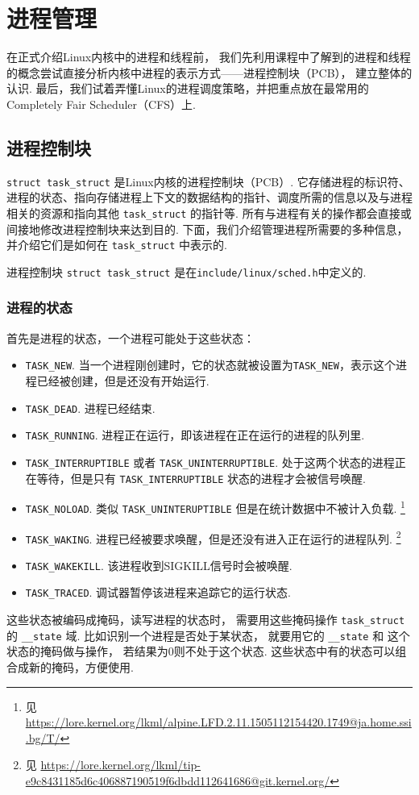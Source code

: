 \section{进程管理}
在正式介绍Linux内核中的进程和线程前，
我们先利用课程中了解到的进程和线程的概念尝试直接分析内核中进程的表示方式——进程控制块（PCB），
建立整体的认识.
最后，我们试着弄懂Linux的进程调度策略，并把重点放在最常用的
Completely Fair Scheduler（CFS）上.

\subsection{进程控制块}
\lstinline{struct task_struct} 是Linux内核的进程控制块（PCB）.
它存储进程的标识符、进程的状态、指向存储进程上下文的数据结构的指针、调度所需的信息以及与进程相关的资源和指向其他 \lstinline{task_struct} 的指针等.
所有与进程有关的操作都会直接或间接地修改进程控制块来达到目的.
下面，我们介绍管理进程所需要的多种信息，并介绍它们是如何在 \lstinline{task_struct} 中表示的.

\begin{readsrcbox}{进程控制块}
	\lstinline{struct task_struct} 是在\lstinline{include/linux/sched.h}中定义的.
\end{readsrcbox}

\subsubsection{进程的状态}
首先是进程的状态，一个进程可能处于这些状态：
\begin{itemize}
	\item \lstinline{TASK_NEW}.
	      当一个进程刚创建时，它的状态就被设置为\lstinline{TASK_NEW}，表示这个进程已经被创建，但是还没有开始运行.
	\item \lstinline{TASK_DEAD}.
	      进程已经结束.
	\item \lstinline{TASK_RUNNING}.
	      进程正在运行，即该进程在正在运行的进程的队列里.
	\item \lstinline{TASK_INTERRUPTIBLE} 或者 \lstinline{TASK_UNINTERRUPTIBLE}.
	      处于这两个状态的进程正在等待，但是只有 \lstinline{TASK_INTERRUPTIBLE} 状态的进程才会被信号唤醒.
	\item \lstinline{TASK_NOLOAD}.
	      类似 \lstinline{TASK_UNINTERUPTIBLE} 但是在统计数据中不被计入负载.
	      \footnote{见 \url{https://lore.kernel.org/lkml/alpine.LFD.2.11.1505112154420.1749@ja.home.ssi.bg/T/}}
	\item \lstinline{TASK_WAKING}.
	      进程已经被要求唤醒，但是还没有进入正在运行的进程队列.
	      \footnote{见 \url{https://lore.kernel.org/lkml/tip-e9c8431185d6c406887190519f6dbdd112641686@git.kernel.org/}}
	\item \lstinline{TASK_WAKEKILL}.
	      该进程收到SIGKILL信号时会被唤醒.
	\item \lstinline{TASK_TRACED}.
	      调试器暂停该进程来追踪它的运行状态.
\end{itemize}
这些状态被编码成掩码，读写进程的状态时，
需要用这些掩码操作 \lstinline{task_struct} 的 \lstinline{__state} 域.
比如识别一个进程是否处于某状态，
就要用它的 \lstinline{__state} 和 这个状态的掩码做与操作，
若结果为0则不处于这个状态.
这些状态中有的状态可以组合成新的掩码，方便使用.

